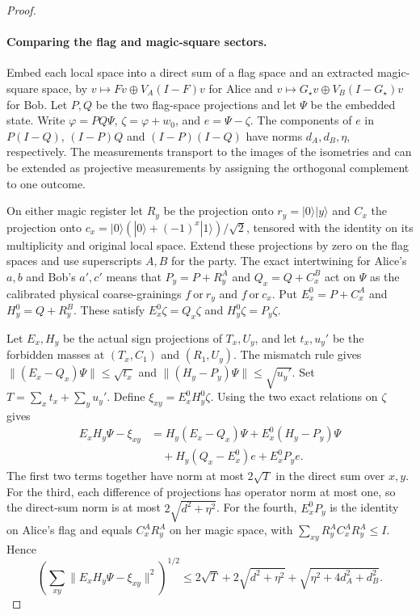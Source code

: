 \begin{proof}
\paragraph{Comparing the flag and magic-square sectors.}
Embed each local space into a direct sum of a flag space and an
extracted magic-square space, by $v\mapsto Fv\oplus V_A(I-F)v$ for Alice
and $v\mapsto G_\star v\oplus V_B(I-G_\star)v$ for Bob. Let $P,Q$ be the two
flag-space projections and let $\Psi$ be the embedded state. Write
$\varphi=PQ\Psi$, $\zeta=\varphi+w_0$, and $e=\Psi-\zeta$. The components
of $e$ in $P(I-Q)$, $(I-P)Q$ and $(I-P)(I-Q)$ have norms
$d_A,d_B,\eta$, respectively. The measurements transport to the images
of the isometries and can be extended as projective measurements by
assigning the orthogonal complement to one outcome.

On either magic register let $R_y$ be the projection onto
$r_y=|0\rangle|y\rangle$ and $C_x$ the projection onto
$c_x=|0\rangle(|0\rangle+(-1)^x|1\rangle)/\sqrt2$, tensored with the
identity on its multiplicity and original local space. Extend these
projections by zero on the flag spaces and use superscripts $A,B$
for the party. The exact intertwining for Alice's $a,b$ and Bob's
$a',c'$ means that $P_y=P+R_y^A$ and $Q_x=Q+C_x^B$ act on $\Psi$
as the calibrated physical coarse-grainings $f\ \text{or}\ r_y$
and $f\ \text{or}\ c_x$. Put $E_x^0=P+C_x^A$ and $H_y^0=Q+R_y^B$.
These satisfy $E_x^0\zeta=Q_x\zeta$ and $H_y^0\zeta=P_y\zeta$.

Let $E_x,H_y$ be the actual sign projections of $T_x,U_y$, and let
$t_x,u_y'$ be the forbidden masses at $(T_x,C_1)$ and $(R_1,U_y)$.
The mismatch rule gives
$\|(E_x-Q_x)\Psi\|\le\sqrt{t_x}$ and
$\|(H_y-P_y)\Psi\|\le\sqrt{u_y'}$. Set $T=\sum_x t_x+\sum_y u_y'$.
Define $\xi_{xy}=E_x^0H_y^0\zeta$. Using the two exact relations on
$\zeta$ gives
\begin{align*}
 E_xH_y\Psi-\xi_{xy}
 &=H_y(E_x-Q_x)\Psi+E_x^0(H_y-P_y)\Psi\\
 &\quad+H_y(Q_x-E_x^0)e+E_x^0P_y e .
\end{align*}
The first two terms together have norm at most $2\sqrt T$ in the
direct sum over $x,y$. For the third, each difference of projections
has operator norm at most one, so the direct-sum norm is at most
$2\sqrt{d^2+\eta^2}$. For the fourth, $E_x^0P_y$ is the identity on
Alice's flag and equals $C_x^A R_y^A$ on her magic space, with
$\sum_{xy}R_y^A C_x^A R_y^A\le I$. Hence
\begin{equation}\label{eq:explicit-sign-support}
 \left(\sum_{xy}\|E_xH_y\Psi-\xi_{xy}\|^2\right)^{1/2}
 \le 2\sqrt T+2\sqrt{d^2+\eta^2}+\sqrt{\eta^2+4d_A^2+d_B^2}.
\end{equation}


\end{proof}
